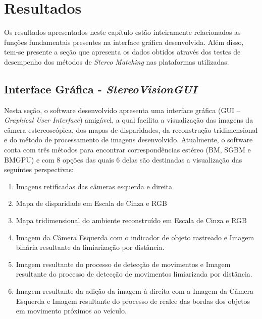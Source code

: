 \chapter{Resultados}
\label{Resultados}

Os resultados apresentados neste capítulo estão inteiramente relacionados as funções fundamentais presentes na interface gráfica desenvolvida. Além disso, tem-se presente a seção que apresenta 
os dados obtidos através dos testes de desempenho dos métodos de \textit{Stereo Matching} nas plataformas utilizadas.


\section{Interface Gráfica - \textit{StereoVisionGUI}}

Nesta seção, o software desenvolvido apresenta uma interface gráfica (GUI -- \textit{Graphical User Interface}) amigável, a qual facilita a visualização das imagens da câmera estereoscópica, 
dos mapas de disparidades, da reconstrução tridimensional e do método de processamento de imagens desenvolvido. Atualmente, o software conta com três métodos para encontrar correspondências 
estéreo (BM, SGBM e BMGPU) e com 8 opções das quais 6 delas são destinadas a visualização das seguintes perspectivas:

\begin{enumerate}
  \item Imagens retificadas das câmeras esquerda e direita
  \item Mapa de disparidade em Escala de Cinza e RGB
  \item Mapa tridimensional do ambiente reconstruído em Escala de Cinza e RGB
  \item Imagem da Câmera Esquerda com o indicador de objeto rastreado e Imagem binária resultante da limiarização por distância.
  \item Imagem resultante do processo de detecção de movimentos e Imagem resultante do processo de detecção de movimentos limiarizada por distância. 
  \item Imagem resultante da adição da imagem à direita com a Imagem da Câmera Esquerda e Imagem resultante do processo de realce das bordas dos objetos em movimento próximos ao veículo.
\end{enumerate} 

